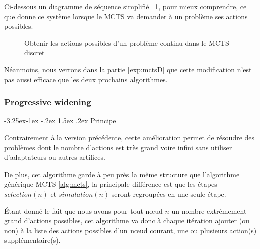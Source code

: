 \documentclass[pdftex,french, english]{article}	%
\makeatletter
\newcounter {subsubsubsection}[subsubsection]
\newcommand\subsubsubsection{\@startsection{subsubsubsection}{4}{\z@}%
                                     {-3.25ex\@plus -1ex \@minus -.2ex}%
                                     {1.5ex \@plus .2ex}%
                                     {\normalfont\normalsize\bfseries}}
\makeatother
\begin{document}
		Ci-dessous un diagramme de séquence simplifié ~\ref{fig:actionsPossibles}, pour mieux comprendre, ce que donne ce système lorsque le MCTS va demander à un problème ses actions possibles.
		\begin{figure}[H]
			\centering
			\caption{Obtenir les actions possibles d'un problème continu dans le MCTS discret} \label{fig:actionsPossibles}
		\end{figure}

		Néanmoins, nous verrons dans la partie \ref{exp:mctsD} que cette modification n'est pas aussi efficace que les deux prochains algorithmes.
	\subsubsection{Progressive widening} \label{pw}

		\subsubsubsection{Principe} \label{pw:principe}

		Contrairement à la version précédente, cette amélioration permet de résoudre des problèmes dont le nombre d'actions est très grand voire infini sans utiliser d'adaptateurs ou autres artifices.

		De plus, cet algorithme garde à peu près la même structure que l'algorithme générique MCTS \ref{alg:mcts}, la principale différence est que les étapes $selection(n)$ et $simulation(n)$ seront regroupées en une seule étape.

		Étant donné le fait que nous avons pour tout nœud $n$ un nombre extrêmement grand d'actions possibles, cet algorithme va donc à chaque itération ajouter (ou non) à la liste des actions possibles d'un nœud courant, une ou plusieurs action(s) supplémentaire(s).
\end{document}
